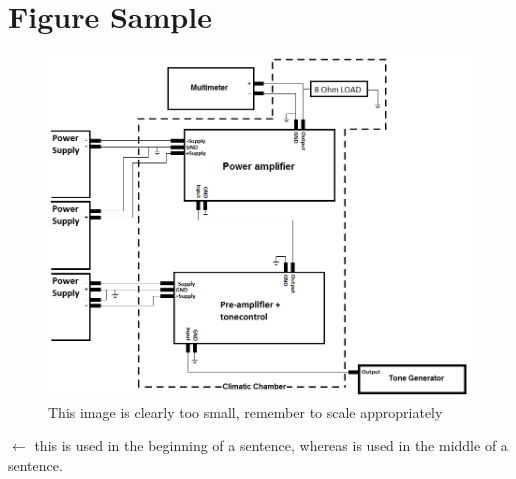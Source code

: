 \chapter{Figure Sample}


\begin{figure}[H]                                   %
  \centering                                        %
  \includegraphics[scale=.3]{figures/filename}
  \caption{This image is clearly too small, remember to scale appropriately}
  \label{FigureLABEL}     %
\end{figure}              %

%
 $\leftarrow$ this is used in the beginning of a sentence, whereas  is used in the middle of a sentence.

